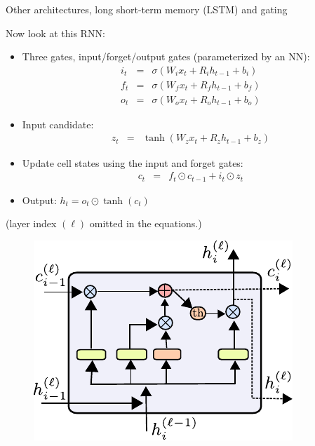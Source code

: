 \begin{frame}{Other architectures, long short-term memory (LSTM) and gating}
\begin{minipage}{0.6\linewidth}
\vsp
Now look at this RNN:
\begin{itemize}
\item Three gates, input/forget/output gates (parameterized by an NN):
\vspace{-3mm}
    \begin{eqnarray*} 
    i_{t} &=& \sigma(W_{i} x_{t} + R_{i} h_{t-1} + b_i) \\
    f_{t} &=& \sigma(W_{f} x_{t} + R_{f} h_{t-1} + b_f) \\
    o_t &=& \sigma(W_{o} x_{t} + R_{o} h_{t-1} + b_o) 
    \end{eqnarray*}
\item Input candidate:
\vspace{-3mm}
    \begin{eqnarray*} 
    z_t &=&  \tanh(W_{z} x_{t} + R_{z} h_{t-1} + b_z) 
    \end{eqnarray*}
\item Update cell states using the input and forget gates:
\vspace{-3mm}
    \begin{eqnarray*} 
    c_{t} &=&  f_{t} \odot c_{t-1} + i_{t} \odot  z_t 
    \end{eqnarray*}
\item Output: $h_t = o_{t} \odot \tanh(c_t)$
\end{itemize}
\vsp
(layer index $(\ell)$ omitted in the equations.)
\end{minipage}
\begin{minipage}{0.39\linewidth}
\begin{figure}
                        \centering
                        \includegraphics[width=.9\linewidth]{./figures/lstm.pdf}
\end{figure}
\end{minipage}
\end{frame}


